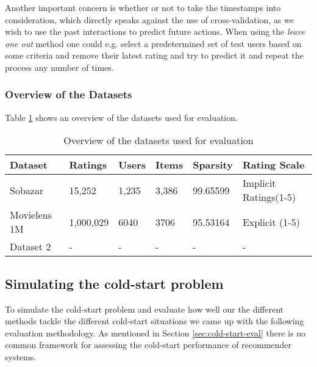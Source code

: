 Another important concern is whether or not to take the timestamps into consideration, which directly speaks against the use of cross-validation, as we wish to use the past interactions to predict future actions. When using the \emph{leave one out} method one could e.g. select a predetermined set of test users based on some criteria and remove their latest rating and try to predict it and repeat the process any number of times.


\subsubsection{Overview of the Datasets}

Table \ref{table:datasets} shows an overview of the datasets used for evaluation.


\begin{table}[H]
    \centering
    \begin{tabular}{|l|l|l|l|l|l}
    \hline
	Dataset			& 	Ratings 	& 	Users	& 	Items 	& 	Sparsity	& Rating Scale 				\\ \hline
	Sobazar 		& 	15,252  	& 	1,235	&	3,386	&	99.65599	& Implicit Ratings(1-5)		\\ \hline
	Movielens 1M	& 	1,000,029   &	6040 	&	3706	&	95.53164	& Explicit (1-5)			\\ \hline
	Dataset 2 		& 	-  			& 	-		&	-		&	-			& -							\\ \hline
    \end{tabular}
    \label{table:datasets}
    \caption [Overview of the datasets used for evaluation]{Overview of the datasets used for evaluation}
\end{table}


\subsection{Simulating the cold-start problem}

To simulate the cold-start problem and evaluate how well our the different methods tackle the different cold-start situations we came up with the following evaluation methodology. As mentioned in Section \ref{sec:cold-start-eval} there is no common framework for assessing the cold-start performance of recommender systems.


